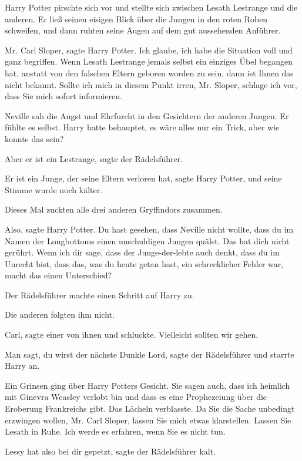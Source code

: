 Harry Potter pirschte sich vor und stellte sich zwischen Lesath Lestrange und
die anderen. Er ließ seinen eisigen Blick über die Jungen in den roten Roben
schweifen, und dann ruhten seine Augen auf dem gut aussehenden Anführer.

\glqq{}Mr. Carl Sloper\grqq{}, sagte Harry Potter. \glqq{}Ich glaube, ich habe
die Situation voll und ganz begriffen. Wenn Lesath Lestrange jemals selbst ein
einziges Übel begangen hat, anstatt von den falschen Eltern geboren worden zu
sein, dann ist Ihnen das nicht bekannt. Sollte ich mich in diesem Punkt irren,
Mr. Sloper, schlage ich vor, dass Sie mich sofort informieren.\grqq{}

Neville sah die Angst und Ehrfurcht in den Gesichtern der anderen Jungen. Er
fühlte es selbst. Harry hatte behauptet, es wäre alles nur ein Trick, aber wie
konnte das sein?

\glqq{}Aber er ist ein Lestrange\grqq{}, sagte der Rädelsführer.

\glqq{}Er ist ein Junge, der seine Eltern verloren hat\grqq{}, sagte Harry
Potter, und seine Stimme wurde noch kälter.

Dieses Mal zuckten alle drei anderen Gryffindors zusammen.

\glqq{}Also\grqq{}, sagte Harry Potter. \glqq{}Du hast gesehen, dass Neville
nicht wollte, dass du im Namen der Longbottoms einen unschuldigen Jungen quälst.
Das hat dich nicht gerührt. Wenn ich dir sage, dass der Junge-der-lebte auch
denkt, dass du im Unrecht bist, dass das, was du heute getan hast, ein
schrecklicher Fehler war, macht das einen Unterschied?\grqq{}

Der Rädelsführer machte einen Schritt auf Harry zu.

Die anderen folgten ihm nicht.

\glqq{}Carl\grqq{}, sagte einer von ihnen und schluckte. \glqq{}Vielleicht
sollten wir gehen.\grqq{}

\glqq{}Man sagt, du wirst der nächste Dunkle Lord\grqq{}, sagte der Rädelsführer
und starrte Harry an.

Ein Grinsen ging über Harry Potters Gesicht. \glqq{}Sie sagen auch, dass ich
heimlich mit Ginevra Weasley verlobt bin und dass es eine Prophezeiung über die
Eroberung Frankreichs gibt.\grqq{} Das Lächeln verblasste. \glqq{}Da Sie die
Sache unbedingt erzwingen wollen, Mr. Carl Sloper, lassen Sie mich etwas
klarstellen. Lassen Sie Lesath in Ruhe. Ich werde es erfahren, wenn Sie es nicht
tun.\grqq{}

\glqq{}Lessy hat also bei dir gepetzt\grqq{}, sagte der Rädelsführer kalt.

